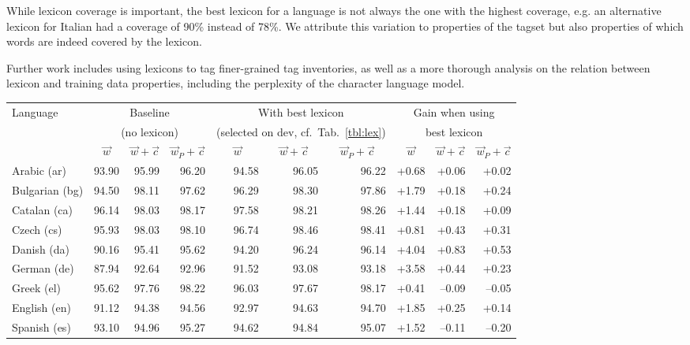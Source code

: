 \documentclass[11pt,letterpaper]{article}
\begin{document}
While lexicon coverage is important, the best lexicon for a language is not always the one with the highest coverage, e.g. an alternative lexicon for Italian had a coverage of 90\% instead of 78\%. We attribute this variation to properties of the tagset but also properties of which words are indeed covered by the lexicon.

Further work includes using lexicons to tag finer-grained tag inventories, as well as a more thorough analysis on the relation between lexicon and training data properties, including the perplexity of the character language model.

\begin{table}
\centering\scriptsize
\begin{tabular}{l|rrr|rrr|rrr}
\toprule
Language & \multicolumn{3}{c}{Baseline} & \multicolumn{3}{c}{With best lexicon} & \multicolumn{3}{c}{Gain when using} \\
 & \multicolumn{3}{c}{(no lexicon)} & \multicolumn{3}{c}{(selected on dev, cf.~Tab.~\ref{tbl:lex})} & \multicolumn{3}{c}{best lexicon} \\
 & \multicolumn{1}{c}{$\vec{w}$} & \multicolumn{1}{c}{$\vec{w}+\vec{c}$} & \multicolumn{1}{c}{$\vec{w}_P+\vec{c}$} & \multicolumn{1}{c}{$\vec{w}$} & \multicolumn{1}{c}{$\vec{w}+\vec{c}$} & \multicolumn{1}{c}{$\vec{w}_P+\vec{c}$} & \multicolumn{1}{c}{$\vec{w}$} & \multicolumn{1}{c}{$\vec{w}+\vec{c}$} & \multicolumn{1}{c}{$\vec{w}_P+\vec{c}$} \\
\midrule
Arabic (ar) & 93.90 & 95.99 & 96.20 & 94.58 & 96.05 & 96.22 & +0.68 & +0.06 & +0.02\\
Bulgarian (bg) & 94.50 & 98.11 & 97.62 & 96.29 & 98.30 & 97.86 & +1.79 & +0.18 & +0.24\\
Catalan (ca) & 96.14 & 98.03 & 98.17 & 97.58 & 98.21 & 98.26 & +1.44 & +0.18 & +0.09\\
Czech (cs) & 95.93 & 98.03 & 98.10 & 96.74 & 98.46 & 98.41 & +0.81 & +0.43 & +0.31\\
Danish (da) & 90.16 & 95.41 & 95.62 & 94.20 & 96.24 & 96.14 & +4.04 & +0.83 & +0.53\\
German (de) & 87.94 & 92.64 & 92.96 & 91.52 & 93.08 & 93.18 & +3.58 & +0.44 & +0.23\\
Greek (el) & 95.62 & 97.76 & 98.22 & 96.03 & 97.67 & 98.17 & +0.41 & --0.09 & --0.05\\
English (en) & 91.12 & 94.38 & 94.56 & 92.97 & 94.63 & 94.70 & +1.85 & +0.25 & +0.14\\
Spanish (es) & 93.10 & 94.96 & 95.27 & 94.62 & 94.84 & 95.07 & +1.52 & --0.11 & --0.20\\

\end{tabular}
\end{table}
\end{document}
